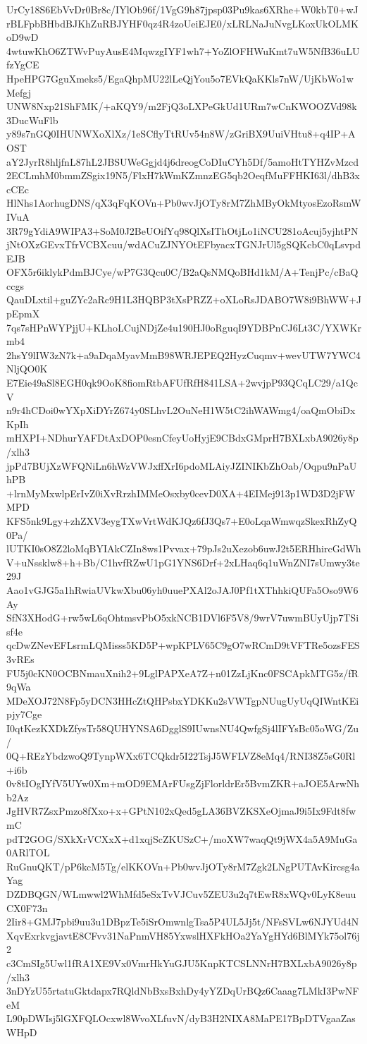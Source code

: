 UrCy18S6EbVvDr0Br8c/IYlOb96f/1VgG9h87jpsp03Pu9kas6XRhe+W0kbT0+wJ
rBLFpbBHbdBJKhZuRBJYHF0qz4R4zoUeiEJE0/xLRLNaJuNvgLKoxUkOLMKoD9wD
4wtuwKhO6ZTWvPuyAusE4MqwzgIYF1wh7+YoZlOFHWuKmt7uW5NfB36uLUfzYgCE
HpeHPG7GguXmeks5/EgaQhpMU22lLeQjYou5o7EVkQaKKls7nW/UjKbWo1wMefgj
UNW8Nxp21ShFMK/+aKQY9/m2FjQ3oLXPeGkUd1URm7wCnKWOOZVd98k3DucWuFlb
y89s7nGQ0IHUNWXoXlXz/1eSCflyTtRUv54n8W/zGriBX9UuiVHtu8+q4IP+AOST
aY2JyrR8hljfnL87hL2JBSUWeGgjd4j6dreogCoDIuCYh5Df/5amoHtTYHZvMzcd
2ECLmhM0bmmZSgix19N5/FlxH7kWmKZmnzEG5qb2OeqfMuFFHKI63l/dhB3xcCEc
HlNhs1AorhugDNS/qX3qFqKOVn+Pb0wvJjOTy8rM7ZhMByOkMtyosEzoRsmWIVuA
3R79gYdiA9WIPA3+SoM0J2BeUOifYq98QlXsIThOtjLo1iNCU281oAcuj5yjhtPN
jNtOXzGEvxTfrVCBXcuu/wdACuZJNYOtEFbyacxTGNJrUl5gSQKcbC0qLsvpdEJB
OFX5r6iklykPdmBJCye/wP7G3Qcu0C/B2aQsNMQoBHd1kM/A+TenjPc/cBaQccgs
QauDLxtil+guZYc2aRc9H1L3HQBP3tXsPRZZ+oXLoRsJDABO7W8i9BhWW+JpEpmX
7qs7sHPnWYPjjU+KLhoLCujNDjZe4u190HJ0oRguqI9YDBPnCJ6Lt3C/YXWKrmb4
2hsY9lIW3zN7k+a9aDqaMyavMmB98WRJEPEQ2HyzCuqmv+wevUTW7YWC4NljQO0K
E7Eie49aSl8EGH0qk9OoK8fiomRtbAFUfRfH841LSA+2wvjpP93QCqLC29/a1QcV
n9r4hCDoi0wYXpXiDYrZ674y0SLhvL2OuNeH1W5tC2ihWAWmg4/oaQmObiDxKpIh
mHXPI+NDhurYAFDtAxDOP0esnCfeyUoHyjE9CBdxGMprH7BXLxbA9026y8p/xlh3
jpPd7BUjXzWFQNiLn6hWzVWJxffXrI6pdoMLAiyJZINIKbZhOab/Oqpu9nPaUhPB
+lrnMyMxwlpErIvZ0iXvRrzhIMMeOsxby0cevD0XA+4EIMej913p1WD3D2jFWMPD
KFS5nk9Lgy+zhZXV3eygTXwVrtWdKJQz6fJ3Qs7+E0oLqaWmwqzSkexRhZyQ0Pa/
lUTKI0sO8Z2loMqBYIAkCZIn8ws1Pvvax+79pJs2uXezob6uwJ2t5ERHhircGdWh
V+uNssklw8+h+Bb/C1hvfRZwU1pG1YNS6Drf+2xLHaq6q1uWnZNI7sUmwy3te29J
Aao1vGJG5a1hRwiaUVkwXbu06yh0uuePXAl2oJAJ0Pf1tXThhkiQUFa5Oso9W6Ay
SfN3XHodG+rw5wL6qOhtmsvPbO5xkNCB1DVl6F5V8/9wrV7uwmBUyUjp7TSisf4e
qcDwZNevEFLsrmLQMisss5KD5P+wpKPLV65C9gO7wRCmD9tVFTRe5ozsFES3vREs
FU5j0cKN0OCBNmauXnih2+9LglPAPXeA7Z+n01ZzLjKnc0FSCApkMTG5z/fR9qWa
MDeXOJ72N8Fp5yDCN3HHcZtQHPsbxYDKKu2sVWTgpNUugUyUqQIWntKEipjy7Cge
I0qtKezKXDkZfysTr58QUHYNSA6DgglS9IUwnsNU4QwfgSj4lIFYsBc05oWG/Zu/
0Q+REzYbdzwoQ9TynpWXx6TCQkdr5I22TsjJ5WFLVZ8eMq4/RNI38Z5sG0Rl+i6b
0v8tIOgIYfV5UYw0Xm+mOD9EMArFUsgZjFlorldrEr5BvmZKR+aJOE5ArwNhb2Az
JgHVR7ZsxPmzo8fXxo+x+GPtN102xQed5gLA36BVZKSXeOjmaJ9i5Ix9Fdt8fwmC
pdT2GOG/SXkXrVCXxX+d1xqjScZKUSzC+/moXW7waqQt9jWX4a5A9MuGa0ARlTOL
RuGnuQKT/pP6kcM5Tg/elKKOVn+Pb0wvJjOTy8rM7Zgk2LNgPUTAvKircsg4aYag
DZDBQGN/WLmwwl2WhMfd5eSxTvVJCuv5ZEU3u2q7tEwR8xWQv0LyK8euuCX0F73n
2Iir8+GMJ7pbi9uu3u1DBpzTe5iSrOmwnlgTsa5P4UL5Jj5t/NFsSVLw6NJYUd4N
XqvExrkvgjavtE8CFvv31NaPnmVH85YxwslHXFkHOa2YaYgHYd6BlMYk75ol76j2
c3CmSIg5Uwl1fRA1XE9Vx0VmrHkYuGJU5KnpKTCSLNNrH7BXLxbA9026y8p/xlh3
3nDYzU55rtatuGktdapx7RQldNbBxsBxhDy4yYZDqUrBQz6Caaag7LMkI3PwNFeM
L90pDWIsj5lGXFQLOcxwl8WvoXLfuvN/dyB3H2NIXA8MaPE17BpDTVgaaZasWHpD
